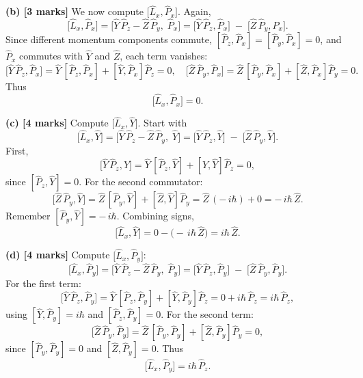 \documentclass{article}
\begin{document}
\textbf{(b) [3 marks]} 
We now compute \(\bigl[\hat{L}_x,\hat{P}_x\bigr]\). Again,
\[
\bigl[\hat{L}_x,\hat{P}_x\bigr] 
= \bigl[\hat{Y}\,\hat{P}_z - \hat{Z}\,\hat{P}_y,\;\hat{P}_x\bigr] 
= \bigl[\hat{Y}\,\hat{P}_z,\hat{P}_x\bigr] \;-\; \bigl[\hat{Z}\,\hat{P}_y,\hat{P}_x\bigr].
\]
Since different momentum components commute, \([\hat{P}_z,\hat{P}_x] = [\hat{P}_y,\hat{P}_x] = 0\), and \(\hat{P}_x\) commutes with \(\hat{Y}\) and \(\hat{Z}\), each term vanishes:
\[
\bigl[\hat{Y}\,\hat{P}_z,\hat{P}_x\bigr] = \hat{Y}\,[\hat{P}_z,\hat{P}_x] + [\hat{Y},\hat{P}_x]\hat{P}_z = 0,
\quad
\bigl[\hat{Z}\,\hat{P}_y,\hat{P}_x\bigr] = \hat{Z}\,[\hat{P}_y,\hat{P}_x] + [\hat{Z},\hat{P}_x]\hat{P}_y = 0.
\]
Thus
\[
\bigl[\hat{L}_x,\hat{P}_x\bigr] = 0.
\]

\textbf{(c) [4 marks]} 
Compute \(\bigl[\hat{L}_x,\hat{Y}\bigr]\). Start with
\[
\bigl[\hat{L}_x,\hat{Y}\bigr] 
= \bigl[\hat{Y}\,\hat{P}_z - \hat{Z}\,\hat{P}_y,\;\hat{Y}\bigr] 
= \bigl[\hat{Y}\,\hat{P}_z,\hat{Y}\bigr] \;-\; \bigl[\hat{Z}\,\hat{P}_y,\hat{Y}\bigr].
\]
First,
\[
\bigl[\hat{Y}\,\hat{P}_z,\hat{Y}\bigr] = \hat{Y}\,[\hat{P}_z,\hat{Y}] + [\hat{Y},\hat{Y}]\hat{P}_z = 0,
\]
since \([\hat{P}_z,\hat{Y}]=0\). For the second commutator:
\[
\bigl[\hat{Z}\,\hat{P}_y,\hat{Y}\bigr] 
= \hat{Z}\,[\hat{P}_y,\hat{Y}] + [\hat{Z},\hat{Y}]\hat{P}_y = \hat{Z}\,(-\,i\hbar) + 0 = -\,i\hbar\,\hat{Z}.
\]
Remember \([\hat{P}_y,\hat{Y}] = -\,i\hbar\). Combining signs,
\[
\bigl[\hat{L}_x,\hat{Y}\bigr] = 0 - \bigl(-\,i\hbar\,\hat{Z}\bigr) = i\hbar\,\hat{Z}.
\]

\textbf{(d) [4 marks]} 
Compute \(\bigl[\hat{L}_x,\hat{P}_y\bigr]\):
\[
\bigl[\hat{L}_x,\hat{P}_y\bigr] 
= \bigl[\hat{Y}\,\hat{P}_z - \hat{Z}\,\hat{P}_y,\;\hat{P}_y\bigr] 
= \bigl[\hat{Y}\,\hat{P}_z,\hat{P}_y\bigr] \;-\; \bigl[\hat{Z}\,\hat{P}_y,\hat{P}_y\bigr].
\]
For the first term:
\[
\bigl[\hat{Y}\,\hat{P}_z,\hat{P}_y\bigr] 
= \hat{Y}\,[\hat{P}_z,\hat{P}_y] + [\hat{Y},\hat{P}_y]\hat{P}_z 
= 0 + i\hbar\,\hat{P}_z = i\hbar\,\hat{P}_z,
\]
using \([\hat{Y},\hat{P}_y] = i\hbar\) and \([\hat{P}_z,\hat{P}_y] = 0\). For the second term:
\[
\bigl[\hat{Z}\,\hat{P}_y,\hat{P}_y\bigr] 
= \hat{Z}\,[\hat{P}_y,\hat{P}_y] + [\hat{Z},\hat{P}_y]\hat{P}_y = 0,
\]
since \([\hat{P}_y,\hat{P}_y]=0\) and \([\hat{Z},\hat{P}_y] = 0\). Thus
\[
\bigl[\hat{L}_x,\hat{P}_y\bigr] = i\hbar\,\hat{P}_z.
\]
\end{document}
